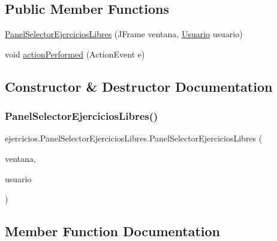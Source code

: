 \subsection*{Public Member Functions}
\begin{DoxyCompactItemize}
\item 
\mbox{\hyperlink{classejercicios_1_1_panel_selector_ejercicios_libres_affa36258e9fe6313fed7d57a05d8891c}{Panel\+Selector\+Ejercicios\+Libres}} (J\+Frame ventana, \mbox{\hyperlink{classclases_1_1_usuario}{Usuario}} usuario)
\item 
void \mbox{\hyperlink{classejercicios_1_1_panel_selector_ejercicios_libres_abec7419f6d45b796b19cc9837bfe0c21}{action\+Performed}} (Action\+Event e)
\end{DoxyCompactItemize}


\subsection{Constructor \& Destructor Documentation}
\mbox{\label{classejercicios_1_1_panel_selector_ejercicios_libres_affa36258e9fe6313fed7d57a05d8891c}} 
\subsubsection{\texorpdfstring{Panel\+Selector\+Ejercicios\+Libres()}{PanelSelectorEjerciciosLibres()}}
{\footnotesize\ttfamily ejercicios.\+Panel\+Selector\+Ejercicios\+Libres.\+Panel\+Selector\+Ejercicios\+Libres (\begin{DoxyParamCaption}\item[{J\+Frame}]{ventana,  }\item[{\mbox{\hyperlink{classclases_1_1_usuario}{Usuario}}}]{usuario }\end{DoxyParamCaption})}



\subsection{Member Function Documentation}
\mbox{\label{classejercicios_1_1_panel_selector_ejercicios_libres_abec7419f6d45b796b19cc9837bfe0c21}} 
